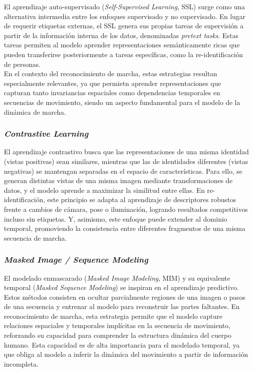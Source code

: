 El aprendizaje auto-supervisado (\textit{Self-Supervised Learning}, SSL) surge como una alternativa intermedia entre los enfoques supervisado y no supervisado. En lugar de requerir etiquetas externas, el SSL genera sus propias tareas de supervisión a partir de la información interna de los datos, denominadas \textit{pretext tasks}. Estas tareas permiten al modelo aprender representaciones semánticamente ricas que pueden transferirse posteriormente a tareas específicas, como la re-identificación de personas. \\
En el contexto del reconocimiento de marcha, estas estrategias resultan especialmente relevantes, ya que permietn aprender representaciones que capturan tanto invariancias espaciales como dependencias temporales en secuencias de movimiento, siendo un aspecto fundamental para el modelo de la dinámica de marcha.


\subsubsection{\textit{Contrastive Learning}}

El aprendizaje contrastivo busca que las representaciones de una misma identidad (vistas positivas) sean similares, mientras que las de identidades diferentes (vistas negativas) se mantengan separadas en el espacio de características. Para ello, se generan distintas vistas de una misma imagen mediante transformaciones de datos, y el modelo aprende a maximizar la similitud entre ellas.  
En re-identificación, este principio se adapta al aprendizaje de descriptores robustos frente a cambios de cámara, pose o iluminación, logrando resultados competitivos incluso sin etiquetas. Y, asimismo, este enfoque puede extender al dominio temporal, promoviendo la consistencia entre diferentes fragmentos de una misma secuencia de marcha.

\subsubsection{\textit{Masked Image / Sequence Modeling}}

El modelado enmascarado (\textit{Masked Image Modeling}, MIM) y su equivalente temporal (\textit{Masked Sequence Modeling}) se inspiran en el aprendizaje predictivo. Estos métodos consisten en ocultar parcialmente regiones de una imagen o pasos de una secuencia y entrenar al modelo para reconstruir las partes faltantes.  
En reconocimiento de marcha, esta estrategia permite que el modelo capture relaciones espaciales y temporales implícitas en la secuencia de movimiento, reforzando su capacidad para comprender la estructura dinámica del cuerpo humano. Esta capacidad es de alta importancia para el modelado temporal, ya que obliga al modelo a inferir la dinámica del movimiento a partir de información incompleta.

